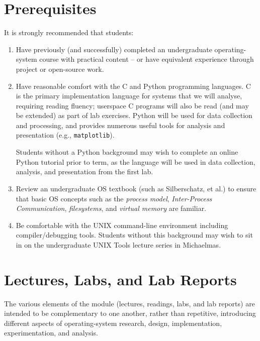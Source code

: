 \documentclass[a4paper,10pt]{article}
\begin{document}
\section{Prerequisites}

It is strongly recommended that students:

\begin{enumerate}
\item Have previously (and successfully) completed an undergraduate
  operating-system course with practical content -- or have equivalent
  experience through project or open-source work.
\item Have reasonable comfort with the C and Python programming languages.
  C is the primary implementation language for systems that we will analyse,
  requiring reading fluency; userspace C programs will also be read (and may
  be extended) as part of lab exercises.
  Python will be used for data collection and processing, and provides
  numerous useful tools for analysis and presentation (e.g.,
  \texttt{matplotlib}).

  Students without a Python background may wish to complete an online Python
  tutorial prior to term, as the language will be used in data collection,
  analysis, and presentation from the first lab.
\item Review an undergraduate OS textbook (such as Silberschatz, et al.) to
  ensure that basic OS concepts such as the \textit{process model},
  \textit{Inter-Process Communication}, \textit{filesystems}, and
  \textit{virtual memory} are familiar.
\item Be comfortable with the UNIX command-line environment including
  compiler/debugging tools.
  Students without this background may wish to sit in on the undergraduate
  UNIX Tools lecture series in Michaelmas.
\end{enumerate}

\section{Lectures, Labs, and Lab Reports}

The various elements of the module (lectures, readings, labs, and lab reports)
are intended to be complementary to one another, rather than repetitive,
introducing different aspects of operating-system research, design,
implementation, experimentation, and analysis.
\end{document}
